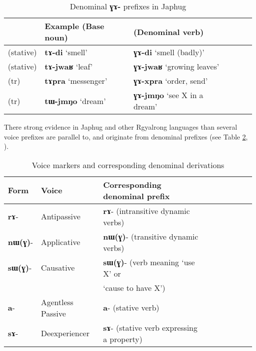 \documentclass[oneside,a4paper,11pt]{article}
\newcommand{\ipa}[1]{\textbf{{\phon\mbox{#1}}}} %
\newcommand{\forme}[2]{\ipa{#1} `#2'}
\begin{document}
\begin{table}[H]
\caption{Denominal \ipa{ɣɤ-} prefixes in Japhug} \label{tab:denominal.GA} \centering
\begin{tabular}{llllll}
\toprule
 & Example (Base noun) & (Denominal verb)\\
\midrule
(stative)& \forme{tɤ-di}{smell} & \forme{ɣɤ-di}{smell (badly)} \\
(stative) & \forme{tɤ-jwaʁ}{leaf} & \forme{ɣɤ-jwaʁ}{growing leaves} \\
\midrule
(tr) & \forme{tɤpra}{messenger} & \forme{ɣɤ-xpra}{order, send} \\
(tr) & \forme{tɯ-jmŋo}{dream} & \forme{ɣɤ-jmŋo}{see X in a dream} \\
\bottomrule
\end{tabular}
\end{table}

There strong evidence in Japhug and other Rgyalrong languages than several voice prefixes are parallel to, and originate from denominal prefixes (see Table \ref{tab:denom}, \citealt{jacques14antipassive}). 


%

\begin{table}[H] \caption{Voice markers and corresponding denominal derivations} \label{tab:denom} \centering
\begin{tabular}{lllllllll} \toprule
Form& Voice & Corresponding denominal prefix \\
\midrule
\ipa{rɤ}- & Antipassive &    \ipa{rɤ}- (intransitive dynamic verbs)\\
\ipa{nɯ(ɣ)}- & Applicative &    \ipa{nɯ(ɣ)}- (transitive dynamic verbs)\\
\ipa{sɯ(ɣ)}- & Causative &    \ipa{sɯ(ɣ)}- (verb meaning `use X' or \\
&& `cause to have X') \\
\ipa{a}- & Agentless Passive &    \ipa{a}- (stative verb)\\
\ipa{sɤ}-  & Deexperiencer &    \ipa{sɤ}- (stative verb expressing a property)\\
    \bottomrule
\end{tabular}
\end{table}
\end{document}
